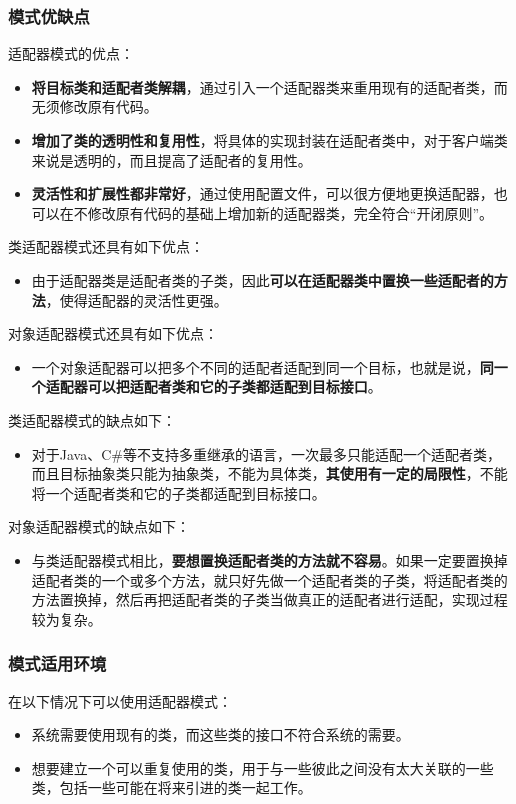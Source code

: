 \subsubsection{模式优缺点}
适配器模式的优点：
\begin{itemize}
    \item \textbf{将目标类和适配者类解耦}，通过引入一个适配器类来重用现有的适配者类，而无须修改原有代码。
    \item \textbf{增加了类的透明性和复用性}，将具体的实现封装在适配者类中，对于客户端类来说是透明的，而且提高了适配者的复用性。
    \item \textbf{灵活性和扩展性都非常好}，通过使用配置文件，可以很方便地更换适配器，也可以在不修改原有代码的基础上增加新的适配器类，完全符合“开闭原则”。
\end{itemize}

类适配器模式还具有如下优点：
\begin{itemize}
    \item 由于适配器类是适配者类的子类，因此\textbf{可以在适配器类中置换一些适配者的方法}，使得适配器的灵活性更强。
\end{itemize}

对象适配器模式还具有如下优点：
\begin{itemize}
    \item 一个对象适配器可以把多个不同的适配者适配到同一个目标，也就是说，\textbf{同一个适配器可以把适配者类和它的子类都适配到目标接口}。
\end{itemize}

类适配器模式的缺点如下：
\begin{itemize}
    \item 对于Java、C\#等不支持多重继承的语言，一次最多只能适配一个适配者类，而且目标抽象类只能为抽象类，不能为具体类，\textbf{其使用有一定的局限性}，不能将一个适配者类和它的子类都适配到目标接口。
\end{itemize}

对象适配器模式的缺点如下：
\begin{itemize}
    \item 与类适配器模式相比，\textbf{要想置换适配者类的方法就不容易}。如果一定要置换掉适配者类的一个或多个方法，就只好先做一个适配者类的子类，将适配者类的方法置换掉，然后再把适配者类的子类当做真正的适配者进行适配，实现过程较为复杂。
\end{itemize}

\subsubsection{模式适用环境}
在以下情况下可以使用适配器模式：
\begin{itemize}
    \item 系统需要使用现有的类，而这些类的接口不符合系统的需要。
    \item 想要建立一个可以重复使用的类，用于与一些彼此之间没有太大关联的一些类，包括一些可能在将来引进的类一起工作。
\end{itemize}

